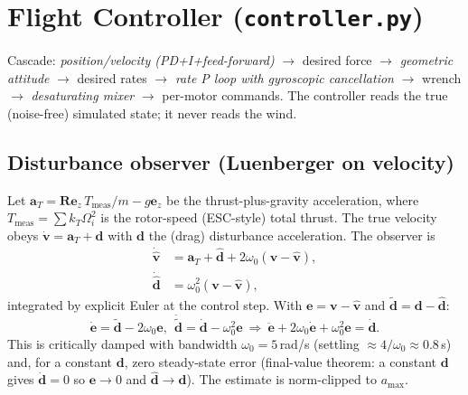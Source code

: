 \documentclass[11pt,a4paper]{article}
\newcommand{\vc}[1]{\bm{#1}}
\newcommand{\ez}{\vc{e}_z}
\newcommand{\code}[1]{\texttt{\small #1}}
\newcommand{\hatv}[1]{\widehat{#1}}
\begin{document}
\section{Flight Controller (\code{controller.py})}
Cascade: \emph{position/velocity (PD+I+feed-forward)} $\to$ desired force $\to$ \emph{geometric attitude} $\to$ desired rates $\to$ \emph{rate P loop with gyroscopic cancellation} $\to$ wrench
$\to$ \emph{desaturating mixer} $\to$ per-motor commands. The controller reads the true (noise-free) simulated state; it never reads the wind.

\subsection{Disturbance observer (Luenberger on velocity)}
Let $\vc a_T=\vc R\ez\,T_{\text{meas}}/m-g\ez$ be the thrust-plus-gravity acceleration, where $T_{\text{meas}}=\sum k_T\Omega_i^2$ is the rotor-speed (ESC-style) total thrust.
The true velocity obeys $\dot{\vc v}=\vc a_T+\vc d$ with $\vc d$ the (drag) disturbance acceleration. The observer is
\begin{align}
\dot{\hatv{\vc v}}&=\vc a_T+\hatv{\vc d}+2\omega_0(\vc v-\hatv{\vc v}),\\
\dot{\hatv{\vc d}}&=\omega_0^2(\vc v-\hatv{\vc v}),
\end{align}
integrated by explicit Euler at the control step. With $\vc e=\vc v-\hatv{\vc v}$ and $\tilde{\vc d}=\vc d-\hatv{\vc d}$:
\begin{equation}
\dot{\vc e}=\tilde{\vc d}-2\omega_0\vc e,\ \ \dot{\tilde{\vc d}}=\dot{\vc d}-\omega_0^2\vc e
\ \Longrightarrow\
\ddot{\vc e}+2\omega_0\dot{\vc e}+\omega_0^2\vc e=\dot{\vc d}.
\end{equation}
This is critically damped with bandwidth $\omega_0=5$\,rad/s (settling $\approx4/\omega_0\approx0.8$\,s) and, for a constant $\vc d$, zero steady-state error (final-value theorem: a constant $\vc d$ gives $\dot{\vc d}=0$ so $\vc e\to0$ and $\hatv{\vc d}\to\vc d$).
The estimate is norm-clipped to $a_{\max}$.
\end{document}
